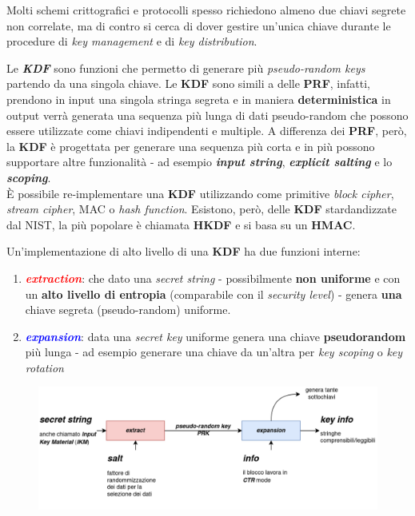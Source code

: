 \begin{flushleft}
    Molti schemi crittografici e protocolli spesso richiedono almeno due chiavi segrete non correlate, ma di contro si cerca di dover gestire un'unica chiave durante le procedure di \textit{key management} e di \textit{key distribution}.

    \smallskip

    Le \textbf{\textit{KDF}} sono funzioni che permetto di generare più \textit{pseudo-random keys} partendo da una singola chiave. Le \textbf{KDF} sono simili a delle \textbf{PRF}, infatti, prendono in input una singola stringa segreta e in maniera \textbf{deterministica} in output verrà generata una sequenza più lunga di dati pseudo-random che possono essere utilizzate come chiavi indipendenti e multiple. A differenza dei \textbf{PRF}, però, la \textbf{KDF} è progettata per generare una sequenza più corta e in più possono supportare altre funzionalità - ad esempio \textbf{\textit{input string}}, \textbf{\textit{explicit salting}} e lo \textbf{\textit{scoping}}. \\
    È possibile re-implementare una \textbf{KDF} utilizzando come primitive \textit{block cipher}, \textit{stream cipher}, MAC o \textit{hash function}. Esistono, però, delle \textbf{KDF} stardandizzate dal NIST, la più popolare è chiamata \textbf{HKDF} e si basa su un \textbf{HMAC}.

    \smallskip

    Un'implementazione di alto livello di una \textbf{KDF} ha due funzioni interne:
    \begin{enumerate}[nosep]
        \item \textcolor{red}{\textbf{\textit{extraction}}}: che dato una \textit{secret string} - possibilmente \textbf{non uniforme} e con un \textbf{alto livello di entropia} (comparabile con il \textit{security level}) - genera \textbf{una} chiave segreta (pseudo-random) uniforme.
        \item \textcolor{blue}{\textbf{\textit{expansion}}}: data una \textit{secret key} uniforme genera una chiave \textbf{pseudorandom} più lunga - ad esempio generare una chiave da un'altra per \textit{key scoping} o \textit{key rotation}
    \end{enumerate}

    \begin{figure}[h]
        \centering
        \includegraphics[width=\textwidth]{img/kdf.png}
    \end{figure}


\end{flushleft}
